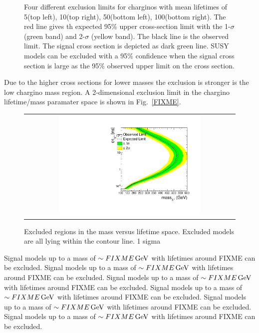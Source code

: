 \begin{figure}[!h]
\begin{tabular}{c}
  \end{tabular}
  \caption{Four different exclusion limits for charginos with mean lifetimes of 5\cm (top left), 10\cm (top right), 50\cm (bottom left), 100\cm (bottom right).
           The red line gives th expected 95\% upper cross-section limit with the 1-$\sigma$ (green band) and 2-$\sigma$ (yellow band).
           The black line is the observed limit.
           The signal cross section is depicted as dark green line. 
           SUSY models can be excluded with a 95\% confidence when the signal cross section is large as the 95\% observed upper limit on the cross section.}
  \label{fig:1dLimits}
\end{figure} 
Due to the higher cross sections for lower masses the exclusion is stronger is the low chargino mass region.
A 2-dimensional exclusion limit in the chargino lifetime/mass paramater space is shown in Fig.~\ref{FIXME}.
\begin{figure}[!h]
  \centering 
  \begin{tabular}{c}
    \includegraphics[width=0.69\textwidth]{figures/analysis/Interpretation/LimitPlot_2d_log.pdf} 
  \end{tabular}
  \caption{Excluded regions in the mass versus lifetime space.
           Excluded models are all lying within the contour line.
          1 sigma}
  \label{fig:1dLimits}
\end{figure} 
Signal models up to a mass of $\sim FIXME \,\text{Ge}\kern-0.06667em\text{V}$ with lifetimes around FIXME can be excluded.
Signal models up to a mass of $\sim FIXME \,\text{Ge}\kern-0.06667em\text{V}$ with lifetimes around FIXME can be excluded.
Signal models up to a mass of $\sim FIXME \,\text{Ge}\kern-0.06667em\text{V}$ with lifetimes around FIXME can be excluded.
Signal models up to a mass of $\sim FIXME \,\text{Ge}\kern-0.06667em\text{V}$ with lifetimes around FIXME can be excluded.
Signal models up to a mass of $\sim FIXME \,\text{Ge}\kern-0.06667em\text{V}$ with lifetimes around FIXME can be excluded.
Signal models up to a mass of $\sim FIXME \,\text{Ge}\kern-0.06667em\text{V}$ with lifetimes around FIXME can be excluded.
